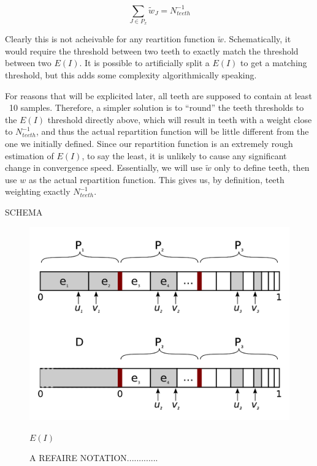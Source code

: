 $$\sum_{J \in P_x} \tilde w_J = N_{teeth}^{-1}$$

Clearly this is not acheivable for any reartition function $\tilde w$. Schematically, it would require the threshold between two teeth to exactly match the threshold between two $E(I)$. It is possible to artificially split a $E(I)$ to get a matching threshold, but this adds some complexity algorithmically speaking.



For reasons that will be explicited later, all teeth are supposed to contain at least ~10 samples. Therefore, a simpler solution is to ``round'' the teeth thresholds to the $E(I)$ threshold directly above, which will result in teeth with a weight close to $N_{teeth}^{-1}$, and thus the actual repartition function will be little different from the one we initially defined. Since our repartition function is an extremely rough estimation of $E(I)$, to say the least, it is unlikely to cause any significant change in convergence speed.
Essentially, we will use $\tilde w$ only to define teeth, then use $w$ as the actual repartition function. This gives us, by definition, teeth weighting exactly $N_{teeth}^{-1}$.


SCHEMA




\begin{figure}[h!]
	\begin{center}
		\includegraphics[width=0.9\columnwidth]{figures/pt2/move_to_deterministic}
		\caption{A REFAIRE NOTATION.............}
		\label{fig:move_to_deterministic}
		$E(I)$
	\end{center}
\end{figure}


